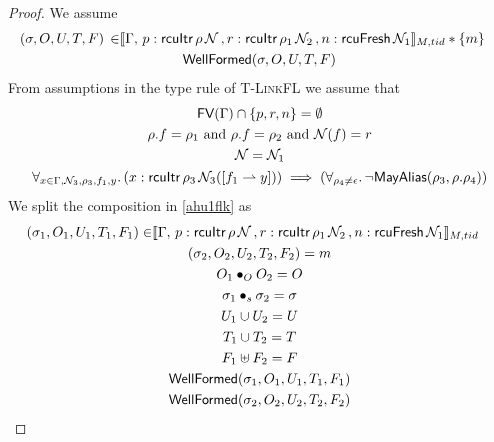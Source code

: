  \begin{proof}
 We assume
\begin{gather}\label{ahu1flk}
  \begin{aligned}
    (\sigma, O, U, T,F) \, \in &  \llbracket \Gamma,\,
 p:\textsf{rcuItr}\, \rho \, \mathcal{N} \, ,
  r:\textsf{rcuItr}\, \rho_1 \, \mathcal{N}_2 \, , n:\textsf{rcuFresh} \, \mathcal{N}_1 \rrbracket_{M,tid} * \{m\}
    \end{aligned} \\
\textsf{WellFormed}(\sigma,O,U,T,F)
\label{ahu2flk}
\end{gather}
From assumptions in the type rule of \textsc{T-LinkFL} we assume that
\begin{gather}
\textsf{FV}(\Gamma) \cap \{p,r,n\}  =\emptyset 
  \label{ahu3flk} \\
\rho.f  = \rho_1 \text{ and } \rho.f  = \rho_2 \text{ and } \mathcal{N}(f) = r
    \label{ahu4flk} \\
\mathcal{N} = \mathcal{N}_1
\label{ahu5flk} \\
\begin{aligned}
  \forall_{x \in \Gamma, \mathcal{N}_3, \rho_3,f_1,y} \ldotp (x:\textsf{rcuItr}\,\rho_3\,\mathcal{N}_3([f_1\rightharpoonup y])) \implies(\forall_{\rho_4\neq \epsilon} \ldotp \neg\mathsf{MayAlias}(\rho_3, \rho.\rho_4) )
\label{ahu6flk}
  \end{aligned}
\end{gather}
We split the composition in  \ref{ahu1flk} as 
\begin{gather} \label{ahu11flk}
  \begin{aligned}
    (\sigma_1, O_{1}, U_{1}, T_{1} ,F_1) \in & \llbracket \Gamma,\,
 p:\textsf{rcuItr}\, \rho \, \mathcal{N} \, ,
  r:\textsf{rcuItr}\, \rho_1 \, \mathcal{N}_2 \, , n:\textsf{rcuFresh} \, \mathcal{N}_1 \rrbracket_{M,tid} \end{aligned}\\
\label{ahu12flk}
(\sigma_2, O_{2}, U_{2}, T_{2},F_2) = m
\\
\label{ahu13flk}
O_{1} \bullet_{O} O_{2} = O
\\
\label{ahusigflk}
\sigma_1 \bullet_s \sigma_2 = \sigma \\
\label{ahu14flk}
U_{1} \cup U_{2} = U
\\
\label{ahu15flk}
T_{1} \cup T_{2} = T
\\
\label{ahuffflk}
F_1 \uplus F_2 = F
\\
\label{ahu16flk}
\textsf{WellFormed}(\sigma_1,O_{1},U_{1},T_{1},F_1)
\\
\label{ahu17flk}
\textsf{WellFormed}(\sigma_2,O_{2},U_{2},T_{2},F_2)
\end{gather}

\end{proof}
